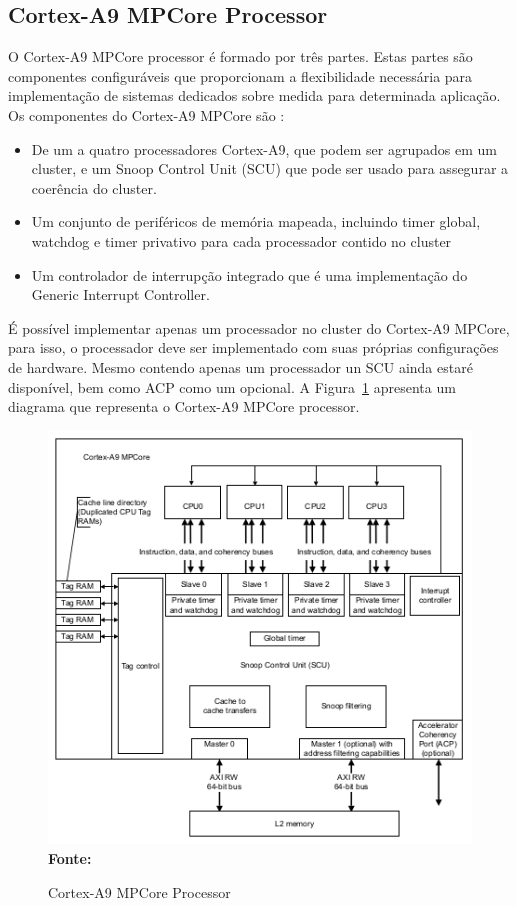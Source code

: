 \subsection{Cortex-A9 MPCore Processor}
O Cortex-A9 MPCore processor é formado por três partes. Estas partes são componentes configuráveis que proporcionam a flexibilidade necessária para implementação de sistemas dedicados sobre medida para determinada aplicação. Os componentes do Cortex-A9 MPCore são \cite{mpcore}:

\begin{itemize}
    \item De um a quatro processadores Cortex-A9, que podem ser agrupados em um cluster, e um Snoop Control Unit (SCU) que pode ser usado para assegurar a coerência do cluster.

    \item Um conjunto de periféricos de memória mapeada, incluindo timer global, watchdog e timer privativo para cada processador contido no cluster
    
    \item Um controlador de interrupção integrado que é uma implementação do Generic Interrupt Controller. 
\end{itemize}

É possível implementar apenas um processador no cluster do Cortex-A9 MPCore, para isso, o processador deve ser implementado com suas próprias configurações de hardware. Mesmo contendo apenas um processador un SCU ainda estaré disponível, bem como ACP como um opcional. A Figura~\ref{fig:mpcore} apresenta um diagrama que representa o Cortex-A9 MPCore processor.

\begin{figure}[ht]
	\caption{Cortex-A9 MPCore Processor}
	\begin{center}
		\includegraphics[scale=0.7]{imagens/mpcoreA9.png}\\
		{\small \textbf{Fonte:} }
    \end{center}\label{fig:mpcore}
\end{figure}

